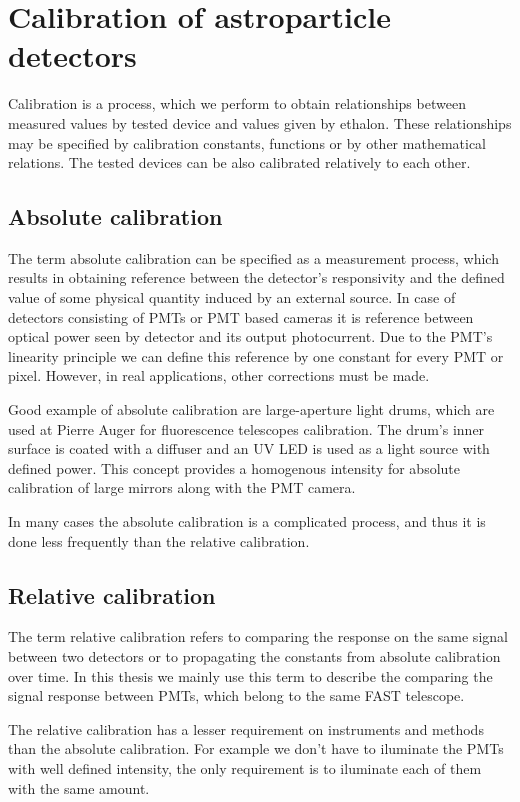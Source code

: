 
\chapter{Calibration of astroparticle detectors}
Calibration is a process, which we perform to obtain relationships between measured values by tested device and values given by ethalon. These relationships may be specified by calibration constants, functions or by other mathematical relations. The tested devices can be also calibrated relatively to each other.
\par
\section{Absolute calibration}
The term absolute calibration can be specified as a measurement process, which results in obtaining reference between the detector's responsivity and the defined value of some physical quantity induced by an external source. In case of detectors consisting of PMTs or PMT based cameras it is reference between optical power seen by detector and its output photocurrent. Due to the PMT's linearity principle we can define this reference by one constant for every PMT or pixel. However, in real applications, other corrections must be made.

\par
Good example of absolute calibration are large-aperture light drums, which are used at Pierre Auger for fluorescence telescopes calibration. The drum's inner surface is coated with a diffuser and an UV LED is used as a light source with defined power. This concept provides a homogenous intensity for absolute calibration of large mirrors along with the PMT camera. 

\par
In many cases the absolute calibration is a complicated process, and thus it is done less frequently than the relative calibration.

\section{Relative calibration}
The term relative calibration refers to comparing the response on the same signal between two detectors or to propagating the constants from absolute calibration over time.
In this thesis we mainly use this term to describe the comparing the signal response between PMTs, which belong to the same FAST telescope. 
\par
The relative calibration has a lesser requirement on instruments and methods than the absolute calibration. For example we don't have to iluminate the PMTs with well defined intensity, the only requirement is to iluminate each of them with the same amount. 


